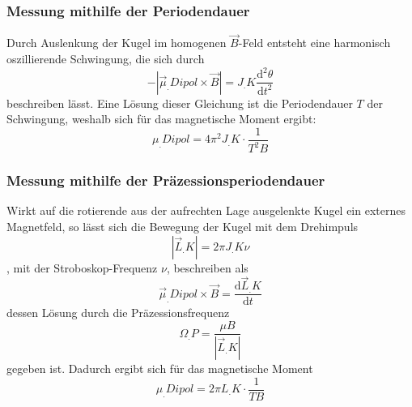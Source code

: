 \subsubsection{Messung mithilfe der Periodendauer}
Durch Auslenkung der Kugel im homogenen $\vec{B}$-Feld entsteht eine harmonisch oszillierende Schwingung, die sich durch
\[-|\vec{\mu}_.{Dipol}\times\vec{B}| = J_.K \frac{\mathrm{d}^2\theta}{\mathrm{d}t^2}\]
beschreiben lässt\cite{V105}.\newline
Eine Lösung dieser Gleichung ist die Periodendauer $T$ der Schwingung,
weshalb sich für das magnetische Moment ergibt:
\begin{equation}
\mu_.{Dipol} = 4\pi^2J_.K\cdot \frac{1}{T^2B}\label{eq:mu2}
\end{equation}

\subsubsection{Messung mithilfe der Präzessionsperiodendauer}
Wirkt auf die rotierende aus der aufrechten Lage ausgelenkte Kugel ein externes Magnetfeld, so lässt sich die Bewegung der Kugel mit dem Drehimpuls 
\begin{equation}|\vec{L}_.K| = 2\pi J_.K \nu\label{eq:L}
\end{equation}, mit der Stroboskop-Frequenz $\nu$,
beschreiben als
\[\vec{\mu}_.{Dipol}\times\vec{B} = \frac{\mathrm{d}\vec{L}_.K}{\mathrm{d}t}\]
dessen Lösung durch die Präzessionsfrequenz
\[\Omega_.P = \frac{\mu B}{|\vec{L}_.K|}\]
gegeben ist\cite{V105}.
Dadurch ergibt sich für das magnetische Moment
\begin{equation}
\mu_.{Dipol} = 2\pi L_.K\cdot \frac{1}{TB}\label{eq:mu3}
\end{equation}